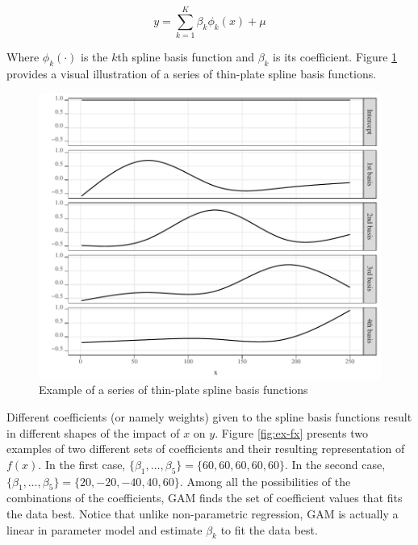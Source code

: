 \documentclass[
]{article}
\begin{document}
\begin{equation}
y = \sum_{k=1}^K \beta_k \phi_k(x) + \mu
\end{equation}

Where \(\phi_k(\cdot)\) is the \(k\)th spline basis function and \(\beta_k\) is its coefficient. Figure \ref{fig:sp-basis} provides a visual illustration of a series of thin-plate spline basis functions.

\begin{figure}[H]

{\centering \includegraphics[width=6in,]{Figures/g_basis} 

}

\caption{Example of a series of thin-plate spline basis functions}\label{fig:sp-basis}
\end{figure}

Different coefficients (or namely weights) given to the spline basis functions result in different shapes of the impact of \(x\) on \(y\). Figure \ref{fig:ex-fx} presents two examples of two different sets of coefficients and their resulting representation of \(f(x)\). In the first case, \(\{\beta_1, \dots, \beta_5\} = \{60, 60, 60, 60, 60\}\). In the second case, \(\{\beta_1, \dots, \beta_5\} = \{20, -20, -40, 40, 60\}\). Among all the possibilities of the combinations of the coefficients, GAM finds the set of coefficient values that fits the data best. Notice that unlike non-parametric regression, GAM is actually a linear in parameter model and estimate \(\beta_k\) to fit the data best.
\end{document}
